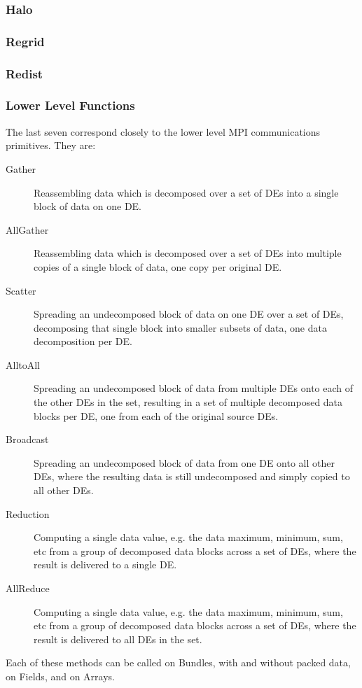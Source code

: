 \subsubsection{Halo}


\subsubsection{Regrid}


\subsubsection{Redist}


\subsubsection{Lower Level Functions}
The last seven correspond closely to the lower level
MPI communications primitives.  They are:
\begin{description}
\item[Gather]
Reassembling data which is decomposed over a set of DEs into a single
block of data on one DE.
\item[AllGather]
Reassembling data which is decomposed over a set of DEs into multiple
copies of a single block of data, one copy per original DE.
\item[Scatter]
Spreading an undecomposed block of data on one DE over a set of DEs,
decomposing that single block into smaller subsets of data, one
data decomposition per DE.
\item[AlltoAll]
Spreading an undecomposed block of data from multiple DEs onto
each of the other DEs in the set, resulting in a set of multiple decomposed 
data blocks per DE, one from each of the original source DEs.
\item[Broadcast]
Spreading an undecomposed block of data from one DE onto all other
DEs, where the resulting data is still undecomposed and simply
copied to all other DEs.
\item[Reduction]
Computing a single data value, e.g. the data maximum, minimum, sum, etc
from a group of decomposed data blocks across a set of DEs, where the
result is delivered to a single DE.
\item[AllReduce]
Computing a single data value, e.g. the data maximum, minimum, sum, etc
from a group of decomposed data blocks across a set of DEs, where the
result is delivered to all DEs in the set.
\end{description}

Each of these methods can be called on Bundles, with and without packed
data, on Fields, and on Arrays.

